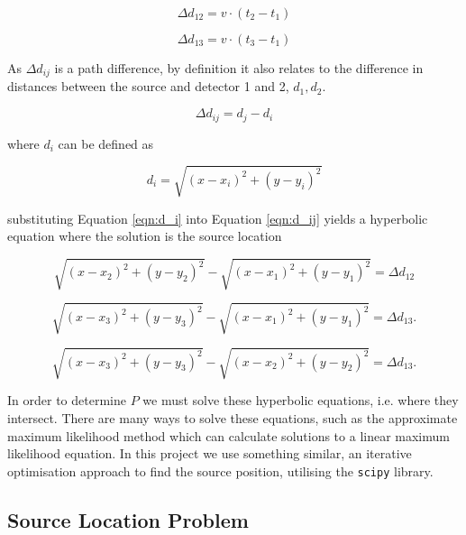 \begin{equation}
\Delta d_{12} = v \cdot (t_2 - t_1)
\label{eqn:dd_12}
\end{equation}

\begin{equation}
\Delta d_{13} = v \cdot (t_3 - t_1)
\label{eqn:2.2}
\end{equation}

As $\Delta d_{ij}$ is a path difference, by definition it also relates to the difference in distances between the source and detector 1 and 2, $d_1, d_2$.

\begin{equation}
    \Delta d_{ij} = d_j - d_i
    \label{eqn:d_ij}
\end{equation}

where $d_i$ can be defined as

\begin{equation}
    d_i = \sqrt{(x-x_i)^2+(y-y_i)^2}
    \label{eqn:d_i}
\end{equation}

substituting Equation \ref{eqn:d_i} into Equation \ref{eqn:d_ij} yields a hyperbolic equation where the solution is the source location \cite{s19112554}

\begin{equation}
\sqrt{(x - x_2)^2 + (y - y_2)^2} - \sqrt{(x - x_1)^2 + (y - y_1)^2} = \Delta d_{12}
\label{eqn:dd12}
\end{equation}

\begin{equation}
\sqrt{(x - x_3)^2 + (y - y_3)^2} - \sqrt{(x - x_1)^2 + (y - y_1)^2} = \Delta d_{13}.
\label{eqn:dd13}
\end{equation}

\begin{equation}
    \sqrt{(x - x_3)^2 + (y - y_3)^2} - \sqrt{(x - x_2)^2 + (y - y_2)^2} = \Delta d_{13}.
\label{eqn:dd23}
\end{equation}

In order to determine $P$ we must solve these hyperbolic equations, i.e. where they intersect. There are many ways to solve these equations, such as the approximate maximum likelihood method \cite{1583909} which can calculate solutions to a linear maximum likelihood equation. In this project we use something similar, an iterative optimisation approach to find the source position, utilising the \lstinline{scipy} library.

\subsection{Source Location Problem}
\label{subsec:2.1.2}


